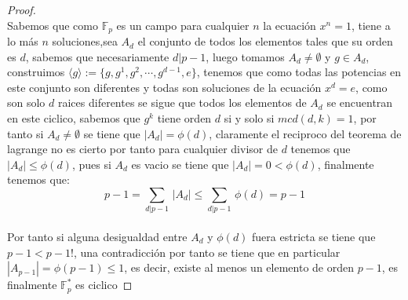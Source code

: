 \documentclass[11pt,letterpaper]{article}
\begin{document}
\begin{proof}\,\\
    Sabemos que como $\mathbb{F}_p$ es un campo para cualquier $n$ la ecuaci\'on $x^n=1$, tiene a lo m\'as $n$ soluciones,sea $A_d$ el conjunto de todos los elementos
    tales que su orden es $d$, sabemos que necesariamente $d|p-1$, luego tomamos $A_d\neq \emptyset$ y $g\in A_d$, construimos $\langle g \rangle:=\{g,g^1,g^2,\cdots,g^{d-1},e\}$, tenemos que como todas las potencias
    en este conjunto son diferentes y todas son soluciones de la ecuaci\'on $x^d=e$, como son solo $d$ raices diferentes se sigue que todos los elementos de $A_d$ se encuentran en este ciclico, sabemos que $g^k$ tiene orden $d$ si y solo si
    $mcd(d,k)=1$, por tanto si $A_d\neq\emptyset$ se tiene que $|A_d|=\phi(d)$, claramente el reciproco del teorema de lagrange no es cierto por tanto para cualquier divisor de $d$ tenemos que $|A_d|\leq\phi(d)$, pues si $A_d$ es vacio se tiene que
    $|A_d|=0<\phi(d)$, finalmente tenemos que:\,\\
    \begin{equation*}
        p-1=\sum_{d|p-1}\,|A_d|\leq \sum_{d|p-1}\,\phi(d)=p-1
    \end{equation*}\,\\
    Por tanto si alguna desigualdad entre $A_d$ y $\phi(d)$ fuera estricta se tiene que $p-1<p-1!$, una contradicci\'on por tanto se tiene que en particular
    $|A_{p-1}|=\phi(p-1)\leq 1$, es decir,  existe al menos un elemento de orden $p-1$, es finalmente $\mathbb{F}_p^*$ es ciclico
\end{proof}
\end{document}
